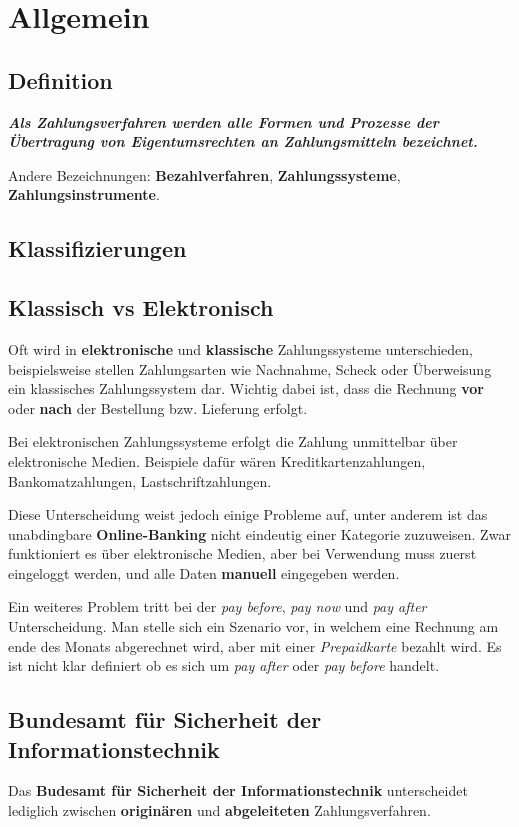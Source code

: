 
\section{Allgemein}
\subsection{Definition}
\textit{\textbf{Als Zahlungsverfahren werden alle Formen und Prozesse der Übertragung von Eigentumsrechten an Zahlungsmitteln bezeichnet.}}

Andere Bezeichnungen: \textbf{Bezahlverfahren}, \textbf{Zahlungssysteme}, \textbf{Zahlungsinstrumente}.

\subsection{Klassifizierungen}
\subsection{Klassisch vs Elektronisch}
Oft wird in \textbf{elektronische} und \textbf{klassische} Zahlungssysteme unterschieden, beispielsweise stellen Zahlungsarten wie Nachnahme, Scheck oder Überweisung ein klassisches Zahlungssystem dar. Wichtig dabei ist, dass die Rechnung \textbf{vor} oder \textbf{nach} der Bestellung bzw. Lieferung erfolgt. 

Bei elektronischen Zahlungssysteme erfolgt die Zahlung unmittelbar über elektronische Medien. Beispiele dafür wären Kreditkartenzahlungen, Bankomatzahlungen, Lastschriftzahlungen. 

Diese Unterscheidung weist jedoch einige Probleme auf, unter anderem ist das unabdingbare \textbf{Online-Banking} nicht eindeutig einer Kategorie zuzuweisen. Zwar funktioniert es über elektronische Medien, aber bei Verwendung muss zuerst eingeloggt werden, und alle Daten \textbf{manuell} eingegeben werden. 

Ein weiteres Problem tritt bei der \textit{pay before}, \textit{pay now} und \textit{pay after} Unterscheidung. Man stelle sich ein Szenario vor, in welchem eine Rechnung am ende des Monats abgerechnet wird, aber mit einer \textit{Prepaidkarte} bezahlt wird. Es ist nicht klar definiert ob es sich um \textit{pay after} oder \textit{pay before} handelt.

\subsection{Bundesamt für Sicherheit der Informationstechnik}
Das \textbf{Budesamt für Sicherheit der Informationstechnik} unterscheidet lediglich zwischen \textbf{originären} und \textbf{abgeleiteten} Zahlungsverfahren.


